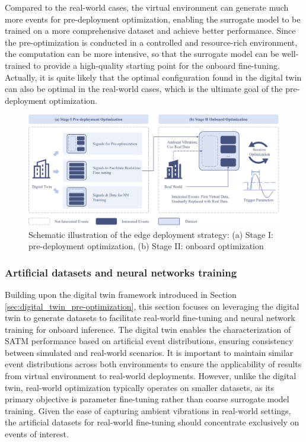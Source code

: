 \documentclass[a4paper,fleqn,numbers,sort&compress]{cas-sc}
\begin{document}
Compared to the real-world cases, the virtual environment can generate much more events for pre-deployment optimization, enabling the surrogate model to be trained on a more comprehensive dataset and achieve better performance. Since the pre-optimization is conducted in a controlled and resource-rich environment, the computation can be more intensive, so that the surrogate model can be well-trained to provide a high-quality starting point for the onboard fine-tuning. Actually, it is quite likely that the optimal configuration found in the digital twin can also be optimal in the real-world cases, which is the ultimate goal of the pre-deployment optimization. 

\begin{figure}[htbp]
    \centering
    \includegraphics[width=\linewidth]{Fig8.jpg}
    \caption{Schematic illustration of the edge deployment strategy: (a) Stage I: pre-deployment optimization, (b) Stage II: onboard optimization}
    \label{fig:Edge Deployment Strategy}
\end{figure}

\subsubsection{Artificial datasets and neural networks training}
\label{sec:artificial_dataset_nn_training}

Building upon the digital twin framework introduced in Section \ref{sec:digital_twin_pre-optimization}, this section focuses on leveraging the digital twin to generate datasets to facilitate real-world fine-tuning and neural network training for onboard inference. The digital twin enables the characterization of SATM performance based on artificial event distributions, ensuring consistency between simulated and real-world scenarios. It is important to maintain similar event distributions across both environments to ensure the applicability of results from virtual environment to real-world deployments. However, unlike the digital twin, real-world optimization typically operates on smaller datasets, as its primary objective is parameter fine-tuning rather than coarse surrogate model training. Given the ease of capturing ambient vibrations in real-world settings, the artificial datasets for real-world fine-tuning should concentrate exclusively on events of interest.
\end{document}
